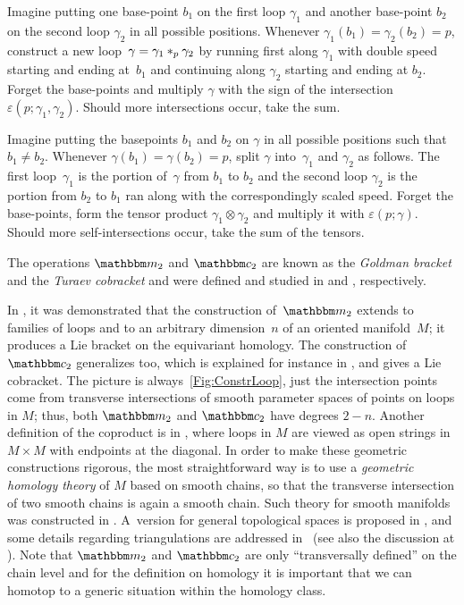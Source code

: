 \documentclass[\MainFolder/Text.tex]{subfiles}
\begin{document}
\begin{description}[leftmargin=*]
 \item[$\StringOp_2$:] Imagine putting one base-point $b_1$ on the first loop $\gamma_1$ and another base-point $b_2$ on the second loop $\gamma_2$ in all possible positions. Whenever $\gamma_1(b_1) = \gamma_2(b_2) = p$, construct a new loop~$\gamma = \gamma_1 *_p \gamma_2$ by running first along $\gamma_1$ with double speed starting and ending at~$b_1$ and continuing along $\gamma_2$ starting and ending at $b_2$. Forget the base-points and multiply $\gamma$ with the sign of the intersection $\varepsilon(p;\gamma_1, \gamma_2)$. Should more intersections occur, take the sum.
 \item[$\StringCoOp_2$:] Imagine putting the basepoints $b_1$ and $b_2$ on $\gamma$ in all possible positions such that $b_1 \neq b_2$. Whenever $\gamma(b_1) = \gamma(b_2)=p$, split $\gamma$ into~$\gamma_1$ and $\gamma_2$ as follows. The first loop~$\gamma_1$ is the portion of~$\gamma$ from $b_1$ to $b_2$ and the second loop $\gamma_2$ is the portion from $b_2$ to $b_1$ ran along with the correspondingly scaled speed. Forget the base-points, form the tensor product $\gamma_1 \otimes \gamma_2$ and multiply it with $\varepsilon(p; \gamma)$. Should more self-intersections occur, take the sum of the tensors.
\end{description}
The operations $\StringOp_2$ and $\StringCoOp_2$ are known as the \emph{Goldman bracket} and the \emph{Turaev cobracket} and were defined and studied in \cite{Goldman1986} and \cite{Turaev1991}, respectively.

In \cite{Sullivan1999}, it was demonstrated that the construction of~$\StringOp_2$ extends to families of loops and to an arbitrary dimension~$n$ of an oriented manifold~$M$; it produces a Lie bracket on the equivariant homology. The construction of $\StringCoOp_2$ generalizes too, which is explained for instance in \cite{Cieliebak2007}, and gives a Lie cobracket. The picture is always~\ref{Fig:ConstrLoop}, just the intersection points come from transverse intersections of smooth parameter spaces of points on loops in $M$; thus, both $\StringOp_2$ and $\StringCoOp_2$ have degrees $2-n$. Another definition of the coproduct is in \cite{Basu2011}, where loops in $M$ are viewed as open strings in $M\times M$ with endpoints at the diagonal. In order to make these geometric constructions rigorous, the most straightforward way is to use a \emph{geometric homology theory} of $M$ based on smooth chains, so that the transverse intersection of two smooth chains is again a smooth chain. Such theory for smooth manifolds was constructed in \cite{Lipyanskiy2014}. A~version for general topological spaces is proposed in \cite{Cieliebak2013}, and some details regarding triangulations are addressed in~\cite{Hajek2014} (see also the discussion at \cite{MO157762}). Note that $\StringOp_2$ and $\StringCoOp_2$ are only ``transversally defined'' on the chain level and for the definition on homology it is important that we can homotop to a generic situation within the homology class.
\end{document}
